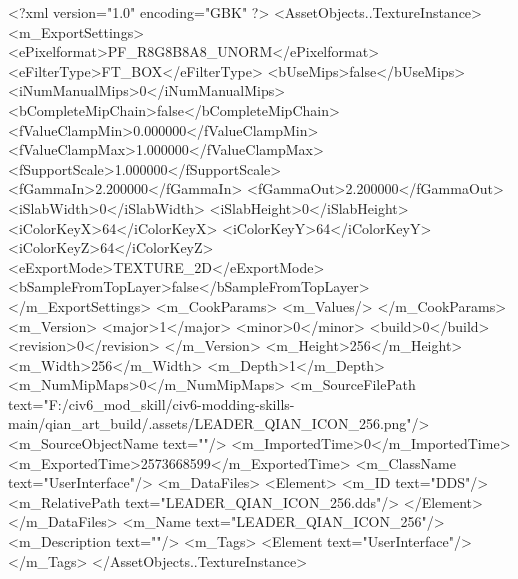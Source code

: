 <?xml version="1.0" encoding="GBK" ?>
<AssetObjects..TextureInstance>
	<m_ExportSettings>
		<ePixelformat>PF_R8G8B8A8_UNORM</ePixelformat>
		<eFilterType>FT_BOX</eFilterType>
		<bUseMips>false</bUseMips>
		<iNumManualMips>0</iNumManualMips>
		<bCompleteMipChain>false</bCompleteMipChain>
		<fValueClampMin>0.000000</fValueClampMin>
		<fValueClampMax>1.000000</fValueClampMax>
		<fSupportScale>1.000000</fSupportScale>
		<fGammaIn>2.200000</fGammaIn>
		<fGammaOut>2.200000</fGammaOut>
		<iSlabWidth>0</iSlabWidth>
		<iSlabHeight>0</iSlabHeight>
		<iColorKeyX>64</iColorKeyX>
		<iColorKeyY>64</iColorKeyY>
		<iColorKeyZ>64</iColorKeyZ>
		<eExportMode>TEXTURE_2D</eExportMode>
		<bSampleFromTopLayer>false</bSampleFromTopLayer>
	</m_ExportSettings>
	<m_CookParams>
		<m_Values/>
	</m_CookParams>
	<m_Version>
		<major>1</major>
		<minor>0</minor>
		<build>0</build>
		<revision>0</revision>
	</m_Version>
	<m_Height>256</m_Height>
	<m_Width>256</m_Width>
	<m_Depth>1</m_Depth>
	<m_NumMipMaps>0</m_NumMipMaps>
	<m_SourceFilePath text="F:/civ6_mod_skill/civ6-modding-skills-main/qian_art_build/.assets/LEADER_QIAN_ICON_256.png"/>
	<m_SourceObjectName text=""/>
	<m_ImportedTime>0</m_ImportedTime>
	<m_ExportedTime>2573668599</m_ExportedTime>
	<m_ClassName text="UserInterface"/>
	<m_DataFiles>
		<Element>
			<m_ID text="DDS"/>
			<m_RelativePath text="LEADER_QIAN_ICON_256.dds"/>
		</Element>
	</m_DataFiles>
	<m_Name text="LEADER_QIAN_ICON_256"/>
	<m_Description text=""/>
	<m_Tags>
		<Element text="UserInterface"/>
	</m_Tags>
</AssetObjects..TextureInstance>
